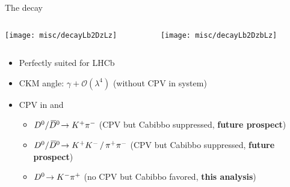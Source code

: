 \begin{frame}{The decay \decay{\Lb}{\Dz\Lz}}
    \begin{columns}[T]
        \begin{column}{.45\textwidth}
            \centering
            \texttt{[image: misc/decayLb2DzLz]}
        \end{column}
        \begin{column}{.45\textwidth}
            \centering
            \texttt{[image: misc/decayLb2DzbLz]}
        \end{column}
    \end{columns}

    \begin{itemize}
        \item Perfectly suited for LHCb
        \item CKM angle: $\gamma + \mathcal{O}(\lambda^4)$ (without CPV in \Dz system)
        \item CPV in \decay{\Lb}{\Dz/\Dzb\Lz} and
        \begin{itemize}
            \item ${{D}^0}/{{\kern 0.2em\overline{\kern -0.2em D}{}}{}^0}\!\rightarrow {\ensuremath{{K}^+}}{\ensuremath{{\pi}^-}}$ (CPV but Cabibbo suppressed, \textbf{future prospect})
            \item ${{D}^0}/{{\kern 0.2em\overline{\kern -0.2em D}{}}{}^0}\!\rightarrow {\ensuremath{{K}^+}}{\ensuremath{{K}^-}} \,/\, {{\pi}^+}{{\pi}^-}$ (CPV but Cabibbo suppressed, \textbf{future prospect})
            \item ${{D}^0}\!\rightarrow {\ensuremath{{K}^-}}{\ensuremath{{\pi}^+}}$ (no CPV but Cabibbo favored, \textcolor{vertexDarkRed}{\textbf{this analysis}})
        \end{itemize}
    \end{itemize}
\end{frame}

